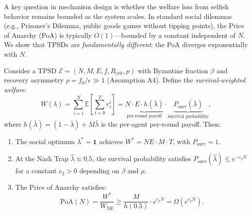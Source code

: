 A key question in mechanism design is whether the welfare loss from
selfish behavior remains bounded as the system scales.
In standard social dilemmas (e.g., Prisoner's Dilemma, public goods games
without tipping points), the Price of Anarchy (PoA) is typically
$O(1)$---bounded by a constant independent of $N$.
We show that TPSDs are \emph{fundamentally different}:
the PoA diverges exponentially with $N$.

\begin{theorem}
\label{thm:poa_full}
Consider a TPSD $\mathcal{E} = (N, M, E, f, R_{\mathrm{crit}}, p)$
with Byzantine fraction $\beta$ and recovery asymmetry
$\rho = f_0 / \epsilon \gg 1$ (Assumption A4).
Define the \emph{survival-weighted welfare}:
\[
  W(\lambda) = \sum_{i=1}^N \mathbb{E}\!\left[\sum_{t=0}^T r_t^i\right]
  = \underbrace{N \cdot E \cdot h(\bar{\lambda})}_{
    \text{per-round payoff}} \cdot
  \underbrace{P_{\mathrm{surv}}(\bar{\lambda})}_{
    \text{survival probability}},
\]
where $h(\bar{\lambda}) = (1 - \bar{\lambda}) + M\bar{\lambda}$
is the per-agent per-round payoff.
Then:
\begin{enumerate}
  \item[(a)] The social optimum $\lambda^* = \mathbf{1}$ achieves
    $W^* = NE \cdot M \cdot T$, with $P_{\mathrm{surv}} = 1$.
  \item[(b)] At the Nash Trap $\hat{\lambda} \approx 0.5$, the
    survival probability satisfies
    $P_{\mathrm{surv}}(\hat{\lambda}) \leq e^{-c_2 N}$
    for a constant $c_2 > 0$ depending on $\beta$ and $\rho$.
  \item[(c)] The Price of Anarchy satisfies:
    \[
      \mathrm{PoA}(N) = \frac{W^*}{W_{\mathrm{NE}}}
      \geq \frac{M}{h(0.5)} \cdot e^{c_2 N}
      = \Omega(e^{c_2 N}).
    \]
\end{enumerate}
\end{theorem}

